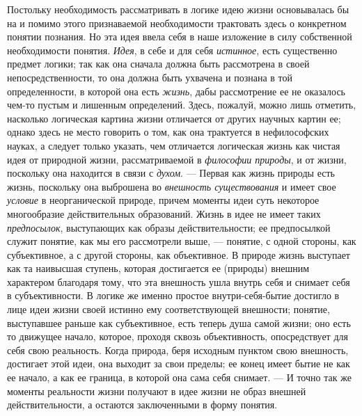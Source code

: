 \documentclass[twoside]{article}
\begin{document}
{{{Постольку необходимость рассматривать в логике идею жизни
основывалась бы на и помимо этого признаваемой необходимости трактовать
здесь о конкретном понятии познания. Но эта идея ввела себя в наше
изложение в силу собственной необходимости понятия.
{\em Идея}, в себе и для
себя {\em истинное}, есть
существенно предмет логики; так как она сначала должна быть рассмотрена в
своей непосредственности, то она должна быть ухвачена и познана в той
определенности, в которой она есть
{\em жизнь}, дабы
рассмотрение ее не оказалось чем-то пустым и лишенным определений. Здесь,
пожалуй, можно лишь отметить, насколько логическая картина жизни отличается
от других научных картин ее; однако здесь не место говорить о том, как она
трактуется в нефилософских науках, а следует только указать, чем отличается
логическая жизнь как чистая идея от природной жизни, рассматриваемой в
{\em философии природы},
и от жизни, поскольку она находится в связи с
{\em духом}. — Первая как
жизнь природы есть жизнь, поскольку она выброшена во
{\em внешность существования}
и имеет свое
{\em условие} в
неорганической природе, причем моменты идеи суть некоторое многообразие
действительных образований. Жизнь в идее не имеет таких
{\em предпосылок},
выступающих как образы действительности; ее предпосылкой
служит понятие, как мы его рассмотрели выше, — понятие, с
одной стороны, как субъективное, а с другой стороны, как объективное. В
природе жизнь выступает как та наивысшая ступень, которая достигается ее
(природы) внешним характером благодаря тому, что эта внешность ушла внутрь
себя и снимает себя в субъективности. В логике же именно простое
внутри-себя-бытие достигло в лице идеи жизни своей истинно ему
соответствующей внешности; понятие, выступавшее раньше как субъективное,
есть теперь душа самой жизни; оно есть то движущее начало, которое, проходя
сквозь объективность, опосредствует для себя свою реальность. Когда
природа, беря исходным пунктом свою внешность, достигает этой идеи, она
выходит за свои пределы; ее конец имеет бытие не как ее начало, а как ее
граница, в которой она сама себя снимает. — И точно так же
моменты реальности жизни получают в идее жизни не образ
внешней действительности, а остаются заключенными в форму понятия.

}}}
\end{document}
